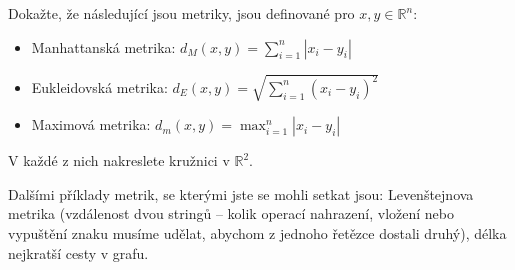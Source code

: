 Dokažte, že následující jsou metriky, jsou definované pro $x, y \in \mathbb{R}^n$:
\begin{itemize}
	\item  Manhattanská metrika: $d_M(x, y) = \sum_{i = 1}^n |x_i - y_i|$
	\item  Eukleidovská metrika: $d_E(x, y) = \sqrt{\sum_{i = 1}^n (x_i - y_i)^2}$
	\item  Maximová metrika: $d_m(x, y) = \max_{i = 1}^n |x_i - y_i|$
\end{itemize}
V každé z nich nakreslete kružnici v $\mathbb{R}^2$.

Dalšími příklady metrik, se kterými jste se mohli setkat jsou:
Levenštejnova metrika (vzdálenost dvou stringů -- kolik operací nahrazení, vložení nebo vypuštění znaku musíme udělat, abychom z jednoho řetězce dostali druhý),
délka nejkratší cesty v grafu.

